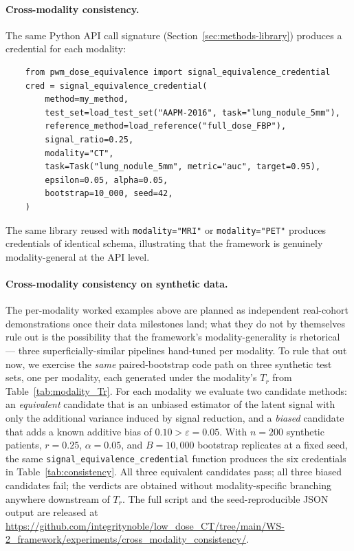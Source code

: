 \documentclass[twoside,11pt]{article}
\newcommand{\todo}[1]{\textcolor{red}{\textbf{[TODO: #1]}}}
\newcommand{\todoTable}[2]{%
  \begin{table}[ht]\centering%
    \fbox{\parbox{0.85\linewidth}{\centering\todo{TABLE: #2}}}%
    \caption{#2 (placeholder; populate when data lands).}\label{#1}%
  \end{table}}
\begin{document}
\todoTable{tab:pet_results}{Signal-equivalence credentials for PET reconstruction methods at $r = 0.25$ (25\% injected activity), task = contrast recovery per sphere size}

\paragraph{Cross-modality consistency.} The same Python API call signature (Section~\ref{sec:methods-library}) produces a credential for each modality:

\begin{verbatim}
    from pwm_dose_equivalence import signal_equivalence_credential
    cred = signal_equivalence_credential(
        method=my_method,
        test_set=load_test_set("AAPM-2016", task="lung_nodule_5mm"),
        reference_method=load_reference("full_dose_FBP"),
        signal_ratio=0.25,
        modality="CT",
        task=Task("lung_nodule_5mm", metric="auc", target=0.95),
        epsilon=0.05, alpha=0.05,
        bootstrap=10_000, seed=42,
    )
\end{verbatim}

The same library reused with \texttt{modality="MRI"} or \texttt{modality="PET"} produces credentials of identical schema, illustrating that the framework is genuinely modality-general at the API level.

\paragraph{Cross-modality consistency on synthetic data.} The per-modality worked examples above are planned as independent real-cohort demonstrations once their data milestones land; what they do not by themselves rule out is the possibility that the framework's modality-generality is rhetorical --- three superficially-similar pipelines hand-tuned per modality. To rule that out now, we exercise the \emph{same} paired-bootstrap code path on three synthetic test sets, one per modality, each generated under the modality's $T_r$ from Table~\ref{tab:modality_Tr}. For each modality we evaluate two candidate methods: an \emph{equivalent} candidate that is an unbiased estimator of the latent signal with only the additional variance induced by signal reduction, and a \emph{biased} candidate that adds a known additive bias of $0.10 > \varepsilon = 0.05$. With $n = 200$ synthetic patients, $r = 0.25$, $\alpha = 0.05$, and $B = 10{,}000$ bootstrap replicates at a fixed seed, the same \texttt{signal\_equivalence\_credential} function produces the six credentials in Table~\ref{tab:consistency}. All three equivalent candidates pass; all three biased candidates fail; the verdicts are obtained without modality-specific branching anywhere downstream of $T_r$. The full script and the seed-reproducible JSON output are released at \url{https://github.com/integritynoble/low_dose_CT/tree/main/WS-2_framework/experiments/cross_modality_consistency/}.
\end{document}
